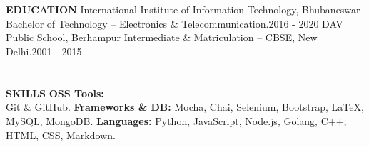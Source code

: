 \documentclass[a4paper, 12pt]{article}
\begin{document}
\section*{}
\begin{vwcol}[widths={0.2, 0.8}, justify=flush, sep=0.7cm, rule=0pt, indent=1em]
\large{\textbf{\textcolor{uclagold}{EDUCATION}}}\newline\newline\newline\newline\newline\newline\newline
\large{International Institute of Information Technology, Bhubaneswar}\vspace{-0.05cm}\newline
\small{\textcolor{frenchblue}{Bachelor of Technology} -- \textcolor{frenchblue}{Electronics \& Telecommunication}}.\hspace{3.05cm}\tiny{2016 - 2020}\vspace{0.2cm}\newline
\large{DAV Public School, Berhampur}\vspace{-0.05cm}\newline
\small{\textcolor{frenchblue}{Intermediate \& Matriculation} -- \textcolor{frenchblue}{CBSE, New Delhi}}.\hspace{4.65cm}\tiny{2001 - 2015}\vspace{-0.05cm}\newline
\normalsize
\end{vwcol}

\vspace{-2.2cm}

\section*{}
\begin{vwcol}[widths={0.2, 0.8}, justify=flush, sep=0.7cm, rule=0pt, indent=1em]
\large{\textbf{\textcolor{uclagold}{SKILLS}}}\newline\newline\newline\newline\newline\newline\newline\newline\newline
\large{\textbf{OSS Tools:\\} Git \& GitHub.}\vspace{0.1cm}\newline
\large{\textbf{Frameworks \& DB:} Mocha, Chai, Selenium, Bootstrap, LaTeX, MySQL, MongoDB.}\vspace{0.1cm}\newline
\large{\textbf{Languages:} Python, JavaScript, Node.js, Golang, C++, HTML, CSS, Markdown.}\vspace{0.1cm}\newline
\end{vwcol}
\end{document}
